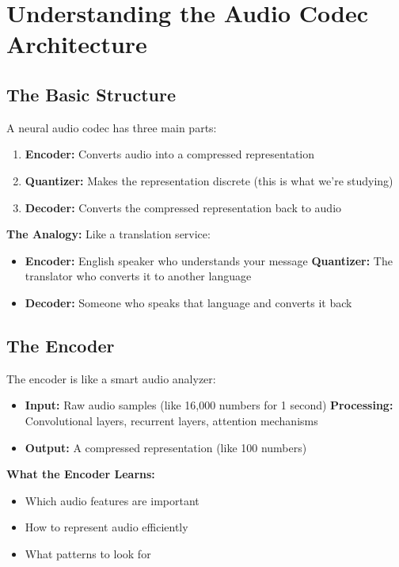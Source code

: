 \documentclass[12pt]{article}
\begin{document}
\section{Understanding the Audio Codec Architecture}

\subsection{The Basic Structure}

A neural audio codec has three main parts:
\begin{enumerate}
    \item \textbf{Encoder:} Converts audio into a compressed representation
    \item \textbf{Quantizer:} Makes the representation discrete (this is what we're studying)
    \item \textbf{Decoder:} Converts the compressed representation back to audio
\end{enumerate}

\textbf{The Analogy:} Like a translation service:
\begin{itemize}
    \item \textbf{Encoder:} English speaker who understands your message
    \textbf{Quantizer:} The translator who converts it to another language
    \item \textbf{Decoder:} Someone who speaks that language and converts it back
\end{itemize}

\subsection{The Encoder}

The encoder is like a smart audio analyzer:
\begin{itemize}
    \item \textbf{Input:} Raw audio samples (like 16,000 numbers for 1 second)
    \textbf{Processing:} Convolutional layers, recurrent layers, attention mechanisms
    \item \textbf{Output:} A compressed representation (like 100 numbers)
\end{itemize}

\textbf{What the Encoder Learns:}
\begin{itemize}
    \item Which audio features are important
    \item How to represent audio efficiently
    \item What patterns to look for
\end{itemize}
\end{document}
